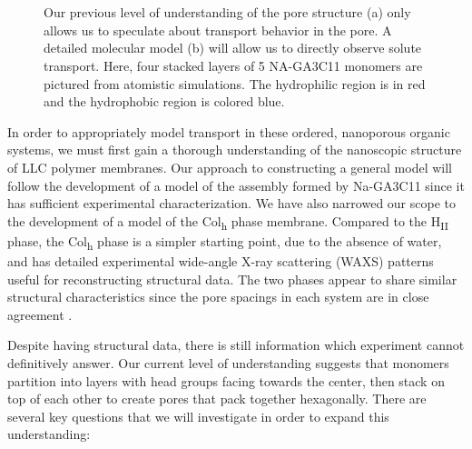 \documentclass{article}
\begin{document}
\begin{figure}
\begin{subfigure}{0.45\linewidth}
		\caption{}~\label{fig:detailed_pore}
	\end{subfigure}
  \caption{Our previous level of understanding of the pore structure (a) only allows us to speculate
	   about transport behavior in the pore. A detailed molecular model (b) will allow us to
	   directly observe solute transport. Here, four stacked layers of 5 NA-GA3C11 monomers
           are pictured from atomistic simulations. The hydrophilic region is in red and the 
	   hydrophobic region is colored blue.}~\label{fig:detail}
  \end{figure}
 
  In order to appropriately model transport in these ordered, nanoporous
  organic systems, we must first gain a thorough understanding of the nanoscopic
  structure of LLC polymer membranes. Our approach to constructing a general
  model will follow the development of a model of the assembly formed by
  Na-GA3C11 since it has sufficient experimental characterization. We have also
  narrowed our scope to the development of a model of the Col\textsubscript{h}
  phase membrane. Compared to the H\textsubscript{II} phase, the
  Col\textsubscript{h} phase is a simpler starting point, due to the absence of
  water, and has detailed experimental wide-angle X-ray scattering (WAXS)
  patterns useful for reconstructing structural data. The two phases appear to
  share similar structural characteristics since the pore spacings in each system
  are in close agreement \cite{feng_thin_2016,resel_structural_2000}.

  Despite having structural data, there is still information which experiment
  cannot definitively answer. Our current level of understanding suggests that
  monomers partition into layers with head groups facing towards the center, then 
  stack on top of each other to create pores that pack together hexagonally.
  There are several key questions that we will investigate in order to
  expand this understanding:
 
\end{document}
